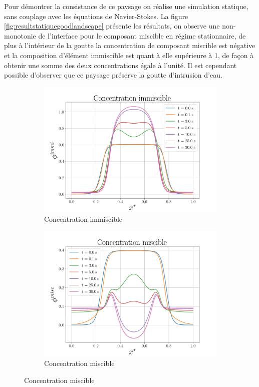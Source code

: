 Pour démontrer la consistance de ce paysage on réalise une simulation statique, sans couplage avec les équations de Navier-Stokes. La figure \ref{fig:resultstatiquegoodlandscape} présente les résultats, on observe une non-monotonie de l'interface pour le composant miscible en régime stationnaire, de plus à l'intérieur de la goutte la concentration de composant miscible est négative et la composition d'élément immiscible est quant à elle supérieure à 1, de façon à obtenir une somme des deux concentrations égale à l'unité. Il est cependant possible d'observer que ce paysage préserve la goutte d'intrusion d'eau.
\begin{figure}[H]
	\centering
	\begin{subfigure}[H]{0.45\textwidth}
		\centering
		\includegraphics[width=\textwidth]{figure/nouveau_parametrage/immiscible_New_Parametrage.png}
		\caption{Concentration immiscible}
		\label{fig:y equals x}
	\end{subfigure}
	\hfill
	\begin{subfigure}[H]{0.45\textwidth}
		\centering
		\includegraphics[width=\textwidth]{figure/nouveau_parametrage/miscible_New_Parametrage.png}
		\caption{Concentration miscible}
		\label{fig:y equals x}
	\end{subfigure}
\end{figure} \vspace{-0.8cm}
